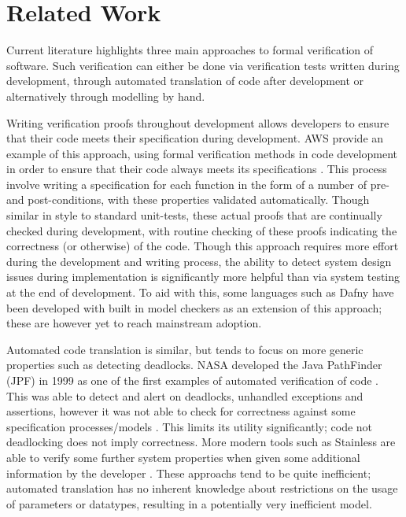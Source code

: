 \section{Related Work}


Current literature highlights three main approaches to formal verification of software. Such verification can either be done via verification tests written during development, through automated translation of code after development or alternatively through modelling by hand.

Writing verification proofs throughout development allows developers to ensure that their code meets their specification during development.
AWS provide an example of this approach, using formal verification methods in code development in order to ensure that their code always meets its specifications \cite{Amazon1,Amazon2}. This process involve writing a specification for each function in the form of a number of pre- and post-conditions, with these properties validated automatically. Though similar in style to standard unit-tests, these actual proofs that are continually checked during development, with routine checking of these proofs indicating the correctness (or otherwise) of the code.
Though this approach requires more effort during the development and writing process, the ability to detect system design issues during implementation is significantly more helpful than via system testing at the end of development. To aid with this, some languages such as Dafny \cite{Dafny} have been developed with built in model checkers as an extension of this approach; these are however yet to reach mainstream adoption.

Automated code translation is similar, but tends to focus on more generic properties such as detecting deadlocks. NASA developed the Java PathFinder (JPF) in 1999 as one of the first examples of automated verification of code \cite{NASA1}. This was able to detect and alert on deadlocks, unhandled exceptions and assertions, however it was not able to check for correctness against some specification processes/models \cite{NASA2}. This limits its utility significantly; code not deadlocking does not imply correctness. More modern tools such as Stainless are able to verify some further system properties when given some additional information by the developer \cite{C4DT}. These approachs tend to be quite inefficient; automated translation has no inherent knowledge about restrictions on the usage of parameters or datatypes, resulting in a potentially very inefficient model.

